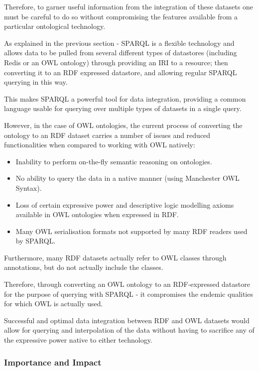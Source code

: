\documentclass{article}
\begin{document}
Therefore, to garner useful information from the integration of these datasets
one must be careful to do so without compromising the features available from a
particular ontological technology.

As explained in the previous section - SPARQL is a flexible technology and allows 
data to be pulled from several different types of datastores (including Redis or an 
OWL ontology) through providing an IRI to a resource; then converting it to an RDF 
expressed datastore, and allowing regular SPARQL querying in this way. 

This makes SPARQL a powerful tool for data integration, providing a common
language usable for querying over multiple types of datasets in a single query.

However, in the case of OWL ontologies, the current process of converting the
ontology to an RDF dataset carries a number of issues and reduced
functionalities when compared to working with OWL natively:

\begin{itemize}
  \item Inability to perform on-the-fly semantic reasoning on ontologies.
  \item No ability to query the data in a native manner (using Manchester OWL Syntax).
  \item Loss of certain expressive power and descriptive logic modelling axioms available in OWL
  ontologies when expressed in RDF.
  \item Many OWL serialisation formats not supported by many RDF readers used by
  SPARQL.
\end{itemize}

Furthermore, many RDF datasets actually refer to OWL classes through
annotations, but do not actually include the classes.

Therefore, through converting an OWL ontology to an RDF-expressed datastore for
the purpose of querying with SPARQL - it compromises the endemic qualities for
which OWL is actually used.

Successful and optimal data integration between RDF and OWL datasets would allow
for querying and interpolation of the data without having to sacrifice any of
the expressive power native to either technology.

\subsubsection{Importance and Impact}
\end{document}
